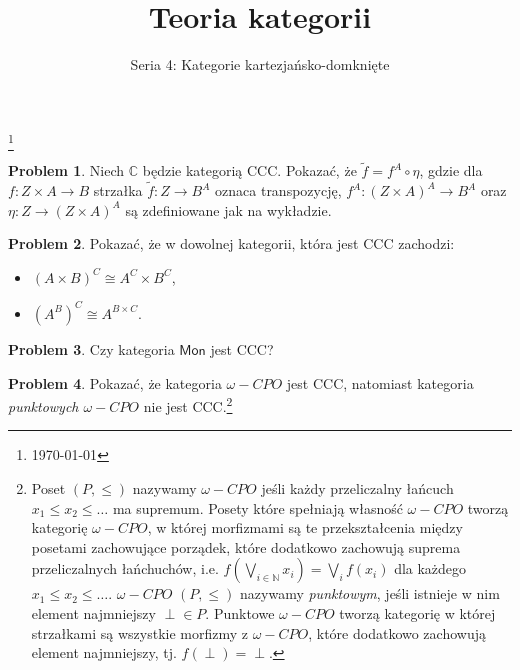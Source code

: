 \documentclass[10pt]{amsart}
\title{Teoria kategorii}
\author{Seria 4: Kategorie kartezjańsko-domknięte}
\theoremstyle{plain}
\theoremstyle{definition}
\newtheorem{problem}{Problem}
\numberwithin{equation}{section}
\newcommand\blfootnote[1]{%
  \begingroup
  \renewcommand\thefootnote{}\footnote{#1}%
  \addtocounter{footnote}{-1}%
  \endgroup
}
\begin{document}
\maketitle

\blfootnote{\today}
\begin{problem}
Niech $\mathbb{C}$ będzie kategorią CCC. Pokazać, że $\tilde{f} = f^A\circ \eta$, gdzie dla $f:Z\times A\to B$ 
strzałka $\tilde{f}:Z\to B^A$ oznaca transpozycję, $f^A:(Z\times A)^A\to B^A$ oraz $\eta:Z\to (Z\times A)^A$ są zdefiniowane 
jak na wykładzie.
\end{problem}

\begin{problem}
Pokazać, że w dowolnej kategorii, która jest CCC zachodzi:
\begin{itemize}
\item $(A\times B)^C \cong A^C\times B^C$,
\item $(A^B)^C \cong A^{B\times C}$.
\end{itemize}
\end{problem}

\begin{problem}
Czy kategoria $\mathsf{Mon}$ jest CCC?
\end{problem}


%

\begin{problem}
Pokazać, że kategoria $\omega-CPO$ jest CCC, natomiast kategoria \emph{punktowych $\omega-CPO$} nie jest CCC.\footnote{Poset $(P,\leq)$ nazywamy $\omega-CPO$ jeśli każdy przeliczalny łańcuch $x_1\leq x_2 \leq \dots$ ma supremum. Posety które spełniają własność $\omega-CPO$ tworzą kategorię $\omega-CPO$, w której morfizmami są te przekształcenia między posetami zachowujące porządek, które dodatkowo zachowują suprema przeliczalnych łańchuchów, i.e. $f(\bigvee_{i\in \mathbb{N}} x_i ) = \bigvee_{i} f(x_i)$ dla każdego $x_1\leq x_2\leq \ldots$. $\omega-CPO$ $(P,\leq)$ nazywamy \emph{punktowym}, jeśli istnieje w nim element najmniejszy $\perp\in P$. Punktowe $\omega-CPO$ tworzą kategorię w której strzałkami są wszystkie morfizmy z $\omega-CPO$, które dodatkowo zachowują element najmniejszy, tj. $f(\perp)= \perp$.}  
\end{problem}
\end{document}

